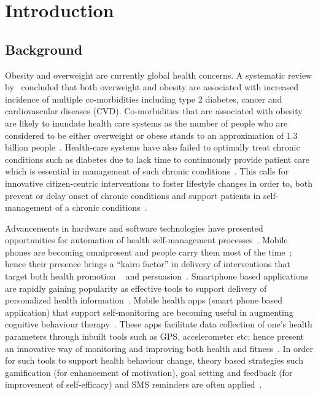 
\chapter{Introduction} %

\label{introductionchapter} %


\section{Background}
Obesity and overweight are currently global health concerns. A systematic review by~\cite{guh2009incidence} concluded that both overweight and obesity are associated with increased incidence of multiple co-morbidities including type 2 diabetes, cancer and cardiovascular diseases (CVD). Co-morbidities that are associated with obesity are likely to inundate health care systems as the number of people who are considered to be either overweight or obese stands to an approximation of  1.3 billion people~\citep{steyn2006chronic}. Health-care systems have also failed to optimally treat chronic conditions such as diabetes due to lack time  to continuously provide  patient  care which is essential in management of such chronic conditions~\citep{quinn2008welldoc}. This calls for innovative citizen-centric  interventions to foster lifestyle changes in order to, both prevent or delay onset of chronic conditions and support patients in self-management of a chronic conditions~\citep{korhonen2010personal,aarsand2012mobile,higgins2016smartphone}.

Advancements in hardware and software technologies have presented opportunities for automation of health self-management processes~\citep{arsand:mobile}. Mobile phones are becoming omnipresent and people carry them most of the time~\citep{mattila2008mobile}; hence their presence brings a ``kairo factor'' in delivery of interventions that target both health promotion ~\citep{pollak2010s} and persuasion~\citep{hsu2014persuasive}. Smartphone based applications are rapidly gaining popularity as effective tools to support delivery of personalized health information~\citep{handel2011mhealth}. Mobile health apps (smart phone based application) that support self-monitoring are becoming useful in augmenting cognitive behaviour therapy~\citep{mattila2008mobile,medynskiy2010salud}. These apps facilitate data collection of one's health parameters through inbuilt tools such as GPS, accelerometer etc; hence present an innovative way of monitoring and improving both health and fitness~\citep{higgins2016smartphone}. In order for such tools to support health behaviour change, theory based strategies such gamification (for enhancement of motivation), goal setting and feedback (for improvement of self-efficacy)  and SMS reminders are often applied~\citep{cole2010text,hamari2014persuasive,hamari2014does,higgins2016smartphone}.
